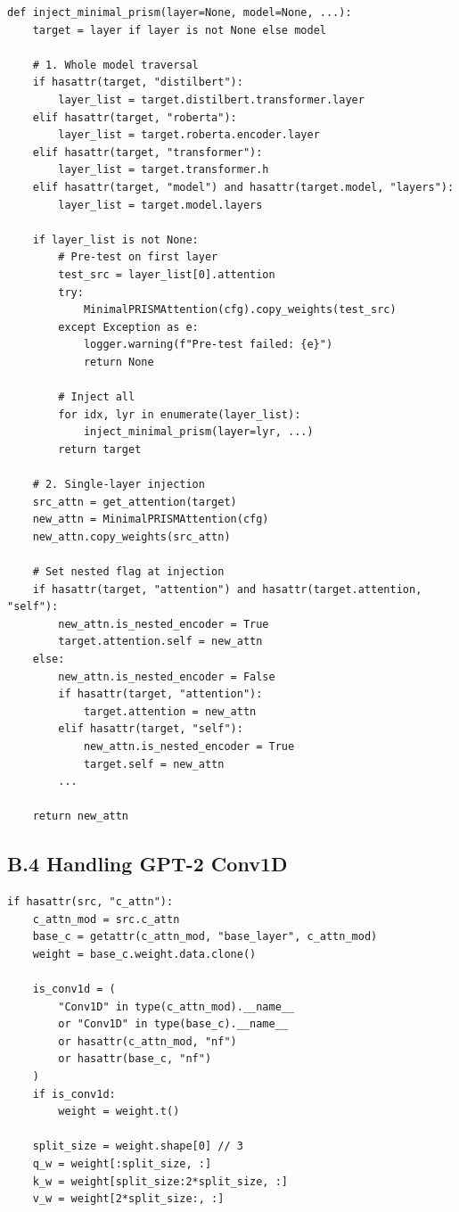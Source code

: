 \begin{lstlisting}
def inject_minimal_prism(layer=None, model=None, ...):
    target = layer if layer is not None else model
    
    # 1. Whole model traversal
    if hasattr(target, "distilbert"):
        layer_list = target.distilbert.transformer.layer
    elif hasattr(target, "roberta"):
        layer_list = target.roberta.encoder.layer
    elif hasattr(target, "transformer"):
        layer_list = target.transformer.h
    elif hasattr(target, "model") and hasattr(target.model, "layers"):
        layer_list = target.model.layers
    
    if layer_list is not None:
        # Pre-test on first layer
        test_src = layer_list[0].attention
        try:
            MinimalPRISMAttention(cfg).copy_weights(test_src)
        except Exception as e:
            logger.warning(f"Pre-test failed: {e}")
            return None
        
        # Inject all
        for idx, lyr in enumerate(layer_list):
            inject_minimal_prism(layer=lyr, ...)
        return target
    
    # 2. Single-layer injection
    src_attn = get_attention(target)
    new_attn = MinimalPRISMAttention(cfg)
    new_attn.copy_weights(src_attn)
    
    # Set nested flag at injection
    if hasattr(target, "attention") and hasattr(target.attention, "self"):
        new_attn.is_nested_encoder = True
        target.attention.self = new_attn
    else:
        new_attn.is_nested_encoder = False
        if hasattr(target, "attention"):
            target.attention = new_attn
        elif hasattr(target, "self"):
            new_attn.is_nested_encoder = True
            target.self = new_attn
        ...
    
    return new_attn
\end{lstlisting}

\subsection{B.4 Handling GPT-2 Conv1D}

\begin{lstlisting}
if hasattr(src, "c_attn"):
    c_attn_mod = src.c_attn
    base_c = getattr(c_attn_mod, "base_layer", c_attn_mod)
    weight = base_c.weight.data.clone()
    
    is_conv1d = (
        "Conv1D" in type(c_attn_mod).__name__
        or "Conv1D" in type(base_c).__name__
        or hasattr(c_attn_mod, "nf")
        or hasattr(base_c, "nf")
    )
    if is_conv1d:
        weight = weight.t()
    
    split_size = weight.shape[0] // 3
    q_w = weight[:split_size, :]
    k_w = weight[split_size:2*split_size, :]
    v_w = weight[2*split_size:, :]
\end{lstlisting}

